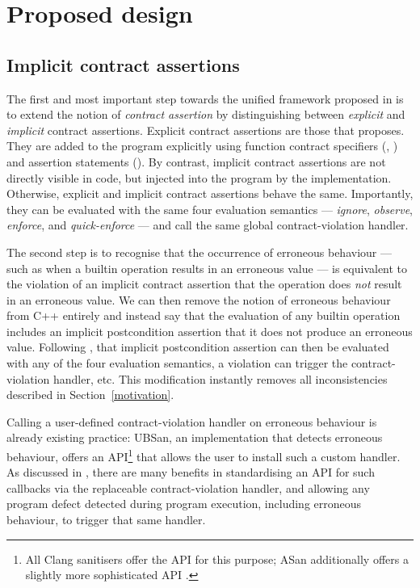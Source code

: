 \section{Proposed design}

\subsection{Implicit contract assertions}

The first  and most important step towards the unified framework proposed in \cite{P3100R1} is to extend the notion of \emph{contract assertion} by distinguishing between \emph{explicit} and \emph{implicit} contract assertions. Explicit contract assertions are those that \cite{P2900R13} proposes. They are added to the program explicitly using function contract specifiers (, ) and assertion statements (\mbox{}). By contrast, implicit contract assertions are not directly visible in code, but injected into the program by the implementation. Otherwise, explicit and implicit contract assertions behave the same. Importantly, they can be evaluated with the same four evaluation semantics --- \emph{ignore}, \emph{observe}, \emph{enforce}, and \emph{quick-enforce} --- and call the same global contract-violation handler. 

The second step is to recognise that the occurrence of erroneous behaviour --- such as when a builtin operation results in an erroneous value --- is equivalent to the violation of an implicit contract assertion that the operation does \emph{not} result in an erroneous value. We can then remove the notion of erroneous behaviour from C++ entirely and instead say that the evaluation of any builtin operation includes an implicit postcondition assertion that it does not produce an erroneous value. Following \cite{P2900R13}, that implicit postcondition assertion can then be evaluated with any of the four evaluation semantics, a violation can trigger the contract-violation handler, etc. This modification instantly removes all inconsistencies described in Section~\ref{motivation}.

Calling a user-defined contract-violation handler on erroneous behaviour is already existing practice: UBSan, an implementation that detects erroneous behaviour, offers an API\footnote{All Clang sanitisers offer the API  for this purpose; ASan additionally offers a slightly more sophisticated API .} that allows the user to install such a custom handler. As discussed in \cite{P3100R1}, there are many benefits in standardising an API for such callbacks via the replaceable contract-violation handler, and allowing any program defect detected during program execution, including erroneous behaviour, to trigger that same handler.

